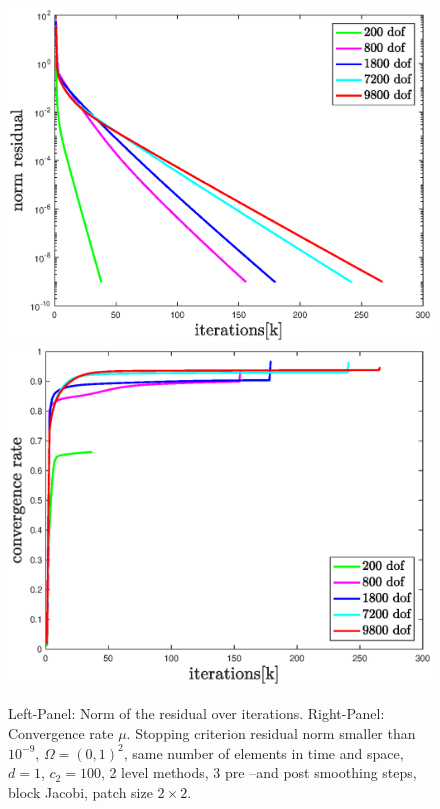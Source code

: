 \documentclass[../draft_1.tex]{subfiles}
\begin{document}
\begin{figure}[h!]
	\centering
	\includegraphics[scale=0.4]{images/implementation/multigrid_scaling/norm_res_scaling_mg}
		\includegraphics[scale=0.4]{images/implementation/multigrid_scaling/convergence_rate_scaling_mg}
	\caption{Left-Panel: Norm of the residual over iterations. Right-Panel: Convergence rate $\mu$. Stopping criterion residual norm smaller than $10^{-9}$, $\Omega = (0,1)^2$, same number of elements in time and space, $d = 1$, $c_2 = 100$, 2 level methods, 3 pre --and post smoothing steps, block Jacobi, patch size $2 \times 2$.}
	\label{fig:scaling_mg}
\end{figure}
\end{document}
